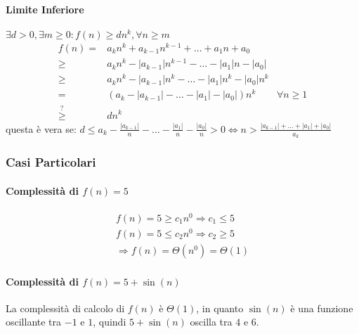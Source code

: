         \paragraph{Limite Inferiore} $ \exists d > 0, \exists m\geq 0: f(n)\geq dn^k,\forall n\geq m $
            $$
                \begin{aligned}
                    f(n)=&a_kn^k + a_{k-1}n^{k-1} + \ldots + a_1n + a_0 \\
                    \geq& a_kn^k - \left|a_{k-1}\right|n^{k-1} - \ldots - \left|a_1\right|n - \left|a_0\right| \\
                    \geq& a_kn^k - \left|a_{k-1}\right|n^k - \ldots - \left|a_1\right|n^k - \left|a_0\right|n^k \\
                    =& (a_k - \left|a_{k-1}\right| - \ldots - \left|a_1\right| - \left|a_0\right|)n^k \quad& \forall n\geq 1\\
                    \stackrel{?}{\geq}& dn^k
                \end{aligned}
            $$
            questa è vera se: $ d\leq a_k - \frac{\left|a_{k-1}\right|}{n} - \ldots - \frac{\left|a_1\right|}{n} - \frac{\left|a_0\right|}{n} >0 \Leftrightarrow n>\frac{\left|a_{k-1}\right| + \ldots + \left|a_1\right| + \left|a_0\right|}{a_k} $     
        \subsubsection{Casi Particolari}
            \paragraph{Complessità di $ f(n) = 5 $}
                $$
                    \begin{aligned}
                        f(n) = 5 \geq c_1n^0 \Rightarrow c_1\leq 5 \\
                        f(n) = 5 \leq c_2n^0 \Rightarrow c_2\geq 5 \\
                        \Rightarrow f(n) = \Theta(n^0) = \Theta(1)
                    \end{aligned}
                $$
            \paragraph{Complessità di $ f(n) = 5 + \sin(n) $}
                La complessità di calcolo di $ f(n) $ è $ \Theta(1) $, in quanto $ \sin(n) $ è una funzione oscillante tra $ -1 $ e $ 1 $, quindi $ 5 + \sin(n) $ oscilla tra $ 4 $ e $ 6 $.


